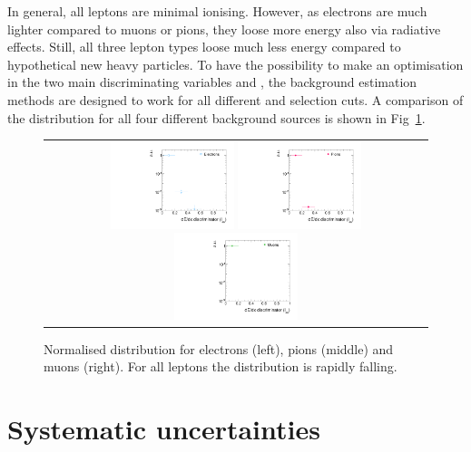 In general, all leptons are minimal ionising.
However, as electrons are much lighter compared to muons or pions, they loose more energy also via radiative effects.
Still, all three lepton types loose much less energy compared to hypothetical new heavy particles.
To have the possibility to make an optimisation in the two main discriminating variables \pt and \ias, the background estimation methods are designed to work for all different \pt and \ias selection cuts.
A comparison of the \ias distribution for all four different background sources is shown in Fig~\ref{fig:IasDist}.
\begin{figure}[!tb]
  \centering 
  \begin{tabular}{c}
    \includegraphics[width=0.33\textwidth]{figures/analysis/IasDistributionForElecs.pdf}
    \includegraphics[width=0.33\textwidth]{figures/analysis/IasDistributionForPions.pdf}
    \includegraphics[width=0.33\textwidth]{figures/analysis/IasDistributionForMuons.pdf}
  \end{tabular}
  \caption{Normalised \ias distribution for electrons (left), pions (middle) and muons (right). 
           For all leptons the \ias distribution is rapidly falling.}
  \label{fig:IasDist}
\end{figure}

\section{Systematic uncertainties}
\label{sec:SysUncertaintiesBkg}


